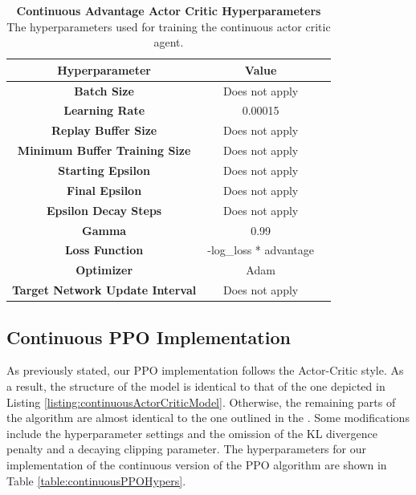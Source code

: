 \documentclass[conference]{IEEEtran}
\begin{document}
\begin{table}[htbp]
    \caption{\textbf{Continuous Advantage Actor Critic Hyperparameters}  The hyperparameters used for training the continuous actor critic agent.}
\begin{center}
\begin{tabular}{|c|c|c|}
\hline
\textbf{Hyperparameter} & \textbf{Value} \\
\hline
\textbf{Batch Size} & Does not apply \\
\hline
\textbf{Learning Rate} & 0.00015 \\
\hline
\textbf{Replay Buffer Size} & Does not apply \\
\hline
\textbf{Minimum Buffer Training Size} & Does not apply \\
\hline
\textbf{Starting Epsilon} & Does not apply \\
\hline
\textbf{Final Epsilon} & Does not apply \\
\hline
\textbf{Epsilon Decay Steps} & Does not apply \\
\hline
\textbf{Gamma} & 0.99\\
\hline
\textbf{Loss Function} &  -log\_loss * advantage \\
\hline
\textbf{Optimizer} & Adam \\
\hline
\textbf{Target Network Update Interval} & Does not apply \\
\hline
\end{tabular}
\label{table:continuousActorCriticHypers}
\end{center}
\end{table}

\subsection{Continuous PPO Implementation}
As previously stated, our PPO implementation follows the Actor-Critic style. As a result, the structure of the model is identical to that of the one depicted in Listing \ref{listing:continuousActorCriticModel}. Otherwise, the remaining parts of the algorithm are almost identical to the one outlined in the \cite{schulman2017proximal}. Some modifications include the hyperparameter settings and the omission of the KL divergence penalty and a decaying clipping parameter. The hyperparameters for our implementation of the continuous version of the PPO algorithm are shown in Table \ref{table:continuousPPOHypers}.
\end{document}
